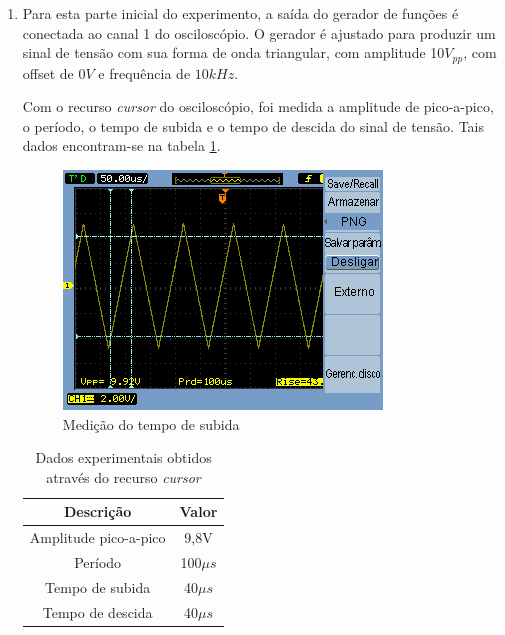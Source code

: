 \documentclass[a4paper]{article} %
\begin{document}
\begin{enumerate}
\item Para esta parte inicial do experimento, a saída do gerador de funções é conectada ao canal 1 do osciloscópio. O gerador é ajustado para produzir um sinal de tensão com sua forma de onda triangular, com amplitude 10$V_{pp}$, com offset de $0V$ e frequência de $10kHz$. 
 
Com o recurso \textit{cursor} do osciloscópio, foi medida a amplitude de pico-a-pico, o período, o tempo de subida e o tempo de descida do sinal de tensão. Tais dados encontram-se na tabela \ref{tab:cursors}. 



\begin{figure}[h]
\begin{centering}
\includegraphics[scale=0.8]{Imagens/4122}\caption{Medição do tempo de subida \label{fig:Fig-4122}}
\par\end{centering}
\end{figure}

\begin{table}[h]
\begin{centering}
\caption{Dados experimentais obtidos através do recurso \textit{cursor} \label{tab:cursors}}

\begin{tabular}{cc}
\hline 
Descrição & Valor\tabularnewline
\hline
Amplitude pico-a-pico & 9,8V\tabularnewline
Período & 100$\mu s$\tabularnewline
Tempo de subida & 40$\mu s$\tabularnewline
Tempo de descida  & 40$\mu s$\tabularnewline
\hline
\end{tabular}
\par\end{centering}


\end{table}
\end{enumerate}
\end{document}
